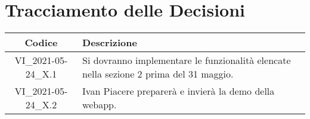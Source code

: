 \section*{Tracciamento delle Decisioni}

\begin{center}
	\begin{longtable}{|c|p{13cm}|}
	\hline
	\rowcolor{lighter-grayer}
	\textbf{Codice} & \textbf{Descrizione} \\
	\hline
	\endfirsthead

	\hline
	VI\_2021-05-24\_X.1 & Si dovranno implementare le funzionalità elencate nella sezione 2 prima del 31 maggio. \\
	\hline
	VI\_2021-05-24\_X.2 & Ivan Piacere preparerà e invierà la demo della webapp. \\
	\hline

	\end{longtable}
\end{center}